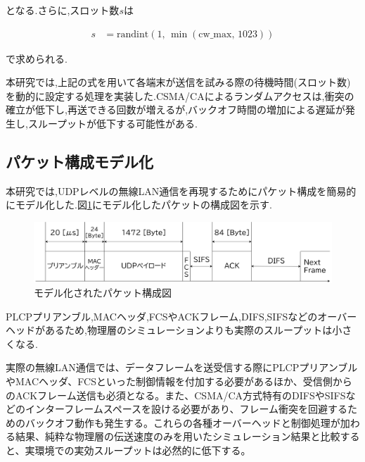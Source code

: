 \documentclass[a4paper, 10pt]{ltjsarticle}
\begin{document}
となる.さらに,スロット数$s$は

\begin{align}
  s &= \mathrm{randint}(1, \, \min(\text{cw\_max}, \, 1023))
  \label{slot}
\end{align}

で求められる.

本研究では,上記の式を用いて各端末が送信を試みる際の待機時間(スロット数)を動的に設定する処理を実装した.CSMA/CAによるランダムアクセスは,衝突の確立が低下し,再送できる回数が増えるが,バックオフ時間の増加による遅延が発生し,スループットが低下する可能性がある.

\subsection{パケット構成モデル化}

本研究では,UDPレベルの無線LAN通信を再現するためにパケット構成を簡易的にモデル化した.図\ref{packet}にモデル化したパケットの構成図を示す.



\begin{figure}[H]
  \centering
  \includegraphics[width=1\columnwidth]{./assets/packet.png}
  \caption{モデル化されたパケット構成図}
  \label{packet}
\end{figure}


PLCPプリアンブル,MACヘッダ,FCSやACKフレーム,DIFS,SIFSなどのオーバーヘッドがあるため,物理層のシミュレーションよりも実際のスループットは小さくなる.

実際の無線LAN通信では、データフレームを送受信する際にPLCPプリアンブルやMACヘッダ、FCSといった制御情報を付加する必要があるほか、受信側からのACKフレーム送信も必須となる。また、CSMA/CA方式特有のDIFSやSIFSなどのインターフレームスペースを設ける必要があり、フレーム衝突を回避するためのバックオフ動作も発生する。これらの各種オーバーヘッドと制御処理が加わる結果、純粋な物理層の伝送速度のみを用いたシミュレーション結果と比較すると、実環境での実効スループットは必然的に低下する。



\end{document}
